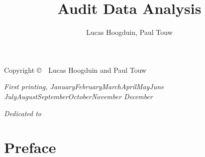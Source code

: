 \documentclass[11pt, showtrims]{memoir}
\title{Audit Data Analysis}
\author{Lucas Hoogduin, Paul Touw}
\theoremstyle{definition} %
\newcommand{\monthyear}{%
  \ifcase\month\or January\or February\or March\or April\or May\or June\or
  July\or August\or September\or October\or November\or
  December\fi\space\number\year
}
\begin{document}
\frontmatter

\maketitle

\cleardoublepage
\thispagestyle{empty}
\begin{center}
\vspace*{\fill}
\setlength{\parindent}{0pt}
\setlength{\parskip}{\baselineskip}
Copyright \copyright\ \the\year\ Lucas Hoogduin and Paul Touw

\textit{First printing, \monthyear}
\vspace*{\fill}
\end{center}

\tableofcontents
\listoffigures
\listoftables

\cleardoublepage
\thispagestyle{empty}
\vspace*{\fill}
\begin{center}
\DoubleSpacing
\fontsize{18}{22}\selectfont\itshape
Dedicated to
\SingleSpacing
\end{center}
\vspace*{\fill}

\cleardoublepage
\chapter*{Preface}

\mainmatter











\printnomenclature
{}

\backmatter

% 
% 

\printindex

\printindex[FSaudit]
\end{document}
